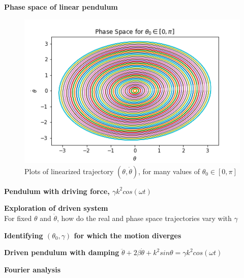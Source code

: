 \documentclass[12pt]{article}
\newenvironment{problem}[2][]{\begin{trivlist}
\item[\hskip \labelsep {\bfseries #1}\hskip \labelsep {\bfseries #2.}]}{\end{trivlist}}
\begin{document}
\begin{problem}{2}
	\textbf{Phase space of linear pendulum}
\begin{figure}[h!]
\centering
  \includegraphics[scale=0.6]{../figures/phaseSpaceLinear.png}
  \caption{Plots of linearized trajectory $(\theta,\dot{\theta})$, for many values of $\theta_{0} \in [0,\pi]$}
  \label{phaseLin}
\end{figure}
\end{problem}

\begin{problem}{3}
	\textbf{Pendulum with driving force, $\gamma k^{2}cos(\omega t)$}
\end{problem}

\begin{problem}{4}
	\textbf{Exploration of driven system} \\
	For fixed $\theta$ and $\dot{\theta}$, how do the real and phase space trajectories vary with $\gamma$
\end{problem}

\begin{problem}{5}
	\textbf{Identifying $(\theta_{0},\gamma)$ for which the motion diverges}
\end{problem}

\begin{problem}{6}
	\textbf{Driven pendulum with damping} $\ddot{\theta}+2\beta\dot{\theta}+k^{2}sin\theta=\gamma k^{2}cos(\omega t)$ \\

\end{problem}

\begin{problem}{7}
	\textbf{Fourier analysis}
\end{problem}
\end{document}
